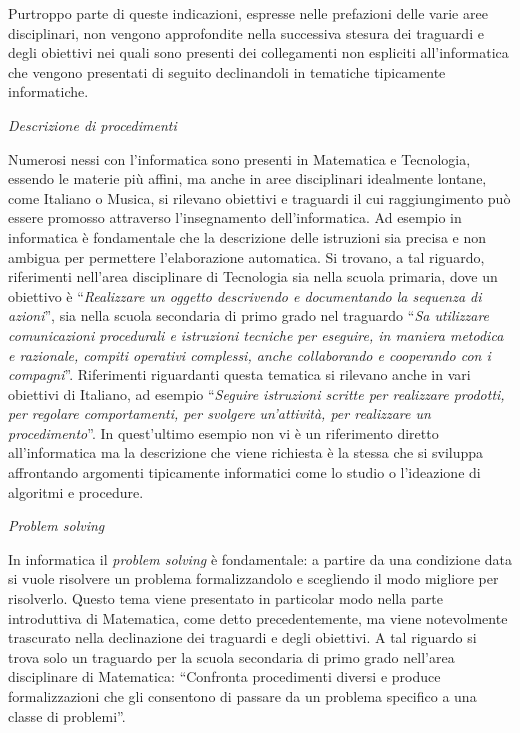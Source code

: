 \documentclass[12pt]{report}
\begin{document}
Purtroppo parte di queste indicazioni, espresse nelle prefazioni delle varie aree disciplinari, non vengono approfondite nella successiva stesura dei traguardi e degli obiettivi nei quali sono presenti dei collegamenti non espliciti all'informatica che vengono presentati di seguito declinandoli in tematiche tipicamente informatiche.


\bigskip
\textit{Descrizione di procedimenti}

\noindent Numerosi nessi con l'informatica sono presenti in Matematica e Tecnologia, essendo le materie più affini, ma anche in aree disciplinari idealmente lontane, come Italiano o Musica, si rilevano obiettivi e traguardi il cui raggiungimento può essere promosso attraverso l'insegnamento dell'informatica. Ad esempio in informatica è fondamentale che la descrizione delle istruzioni sia precisa e non ambigua per permettere l'elaborazione automatica.
Si trovano, a tal riguardo, riferimenti nell'area disciplinare di Tecnologia sia nella scuola primaria, dove un obiettivo è ``\textit{Realizzare un oggetto descrivendo e documentando la sequenza di azioni}'', sia nella scuola secondaria di primo grado nel traguardo ``\textit{Sa utilizzare comunicazioni procedurali e istruzioni tecniche per eseguire, in maniera metodica e razionale, compiti operativi complessi, anche collaborando e cooperando con i compagni}''.
Riferimenti riguardanti questa tematica si rilevano anche in vari obiettivi di Italiano, ad esempio ``\textit{Seguire istruzioni scritte per realizzare prodotti, per regolare comportamenti, per svolgere un'attività, per realizzare un procedimento}''. In quest'ultimo esempio non vi è un riferimento diretto all'informatica ma la descrizione che viene richiesta è la stessa che si sviluppa affrontando argomenti tipicamente informatici come lo studio o l'ideazione di algoritmi e procedure.


\bigskip
\textit{Problem solving}

\noindent In informatica il \textit{problem solving} è fondamentale: a partire da una condizione data si vuole risolvere un problema formalizzandolo e scegliendo il modo migliore per risolverlo. Questo tema viene presentato in particolar modo nella parte introduttiva di Matematica, come detto precedentemente, ma viene notevolmente trascurato nella declinazione dei traguardi e degli obiettivi. A tal riguardo si trova solo un traguardo per la scuola secondaria di primo grado nell'area disciplinare di Matematica: ``Confronta procedimenti diversi e produce formalizzazioni che gli consentono di passare da un problema specifico a una classe di problemi''.
\end{document}
